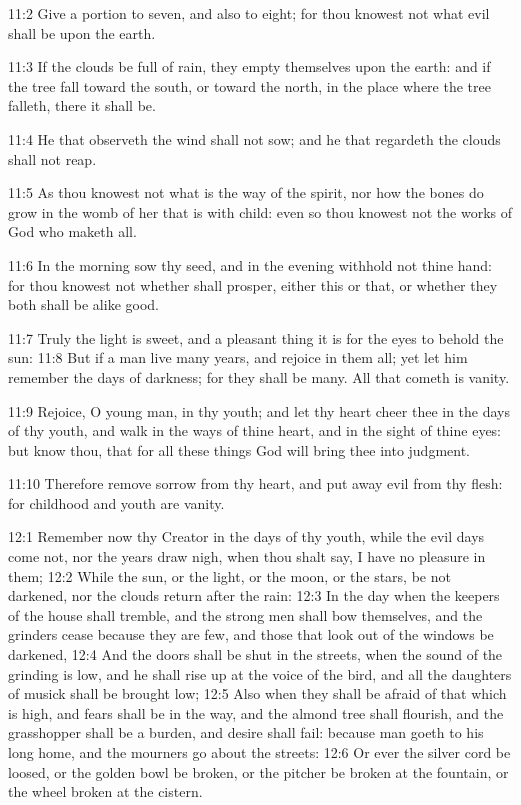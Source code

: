 11:2 Give a portion to seven, and also to eight; for thou knowest not what evil shall be upon the earth.

11:3 If the clouds be full of rain, they empty themselves upon the earth: and if the tree fall toward the south, or toward the north, in the place where the tree falleth, there it shall be.

11:4 He that observeth the wind shall not sow; and he that regardeth the clouds shall not reap.

11:5 As thou knowest not what is the way of the spirit, nor how the bones do grow in the womb of her that is with child: even so thou knowest not the works of God who maketh all.

11:6 In the morning sow thy seed, and in the evening withhold not thine hand: for thou knowest not whether shall prosper, either this or that, or whether they both shall be alike good.

11:7 Truly the light is sweet, and a pleasant thing it is for the eyes to behold the sun: 11:8 But if a man live many years, and rejoice in them all; yet let him remember the days of darkness; for they shall be many. All that cometh is vanity.

11:9 Rejoice, O young man, in thy youth; and let thy heart cheer thee in the days of thy youth, and walk in the ways of thine heart, and in the sight of thine eyes: but know thou, that for all these things God will bring thee into judgment.

11:10 Therefore remove sorrow from thy heart, and put away evil from thy flesh: for childhood and youth are vanity.

12:1 Remember now thy Creator in the days of thy youth, while the evil days come not, nor the years draw nigh, when thou shalt say, I have no pleasure in them; 12:2 While the sun, or the light, or the moon, or the stars, be not darkened, nor the clouds return after the rain: 12:3 In the day when the keepers of the house shall tremble, and the strong men shall bow themselves, and the grinders cease because they are few, and those that look out of the windows be darkened, 12:4 And the doors shall be shut in the streets, when the sound of the grinding is low, and he shall rise up at the voice of the bird, and all the daughters of musick shall be brought low; 12:5 Also when they shall be afraid of that which is high, and fears shall be in the way, and the almond tree shall flourish, and the grasshopper shall be a burden, and desire shall fail: because man goeth to his long home, and the mourners go about the streets: 12:6 Or ever the silver cord be loosed, or the golden bowl be broken, or the pitcher be broken at the fountain, or the wheel broken at the cistern.


